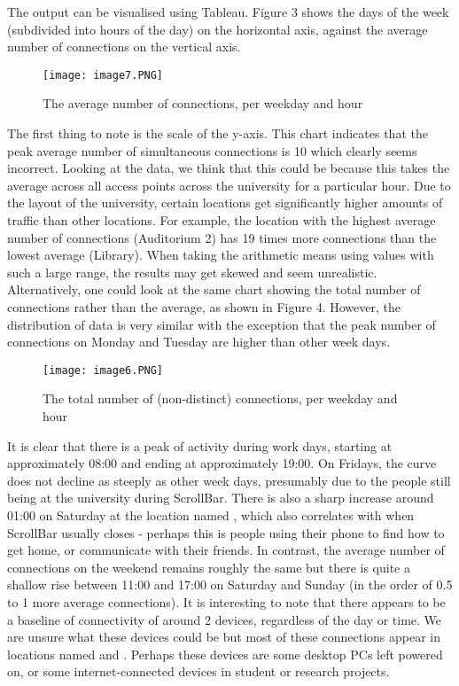 \documentclass[format=acmsmall, review=false, screen=true]{acmart}
\begin{document}
The output can be visualised using Tableau. Figure 3 shows the days of the week (subdivided into hours of the day) on the horizontal axis, against the average number of connections on the vertical axis.

\begin{figure}[H]
  \texttt{[image: image7.PNG]}
  \caption{The average number of connections, per weekday and hour}
  \label{fig:main-diagram}
\end{figure}

The first thing to note is the scale of the y-axis. This chart indicates that the peak average number of simultaneous connections is 10 which clearly seems incorrect. Looking at the data, we think that this could be because this takes the average across all access points across the university for a particular hour. Due to the layout of the university, certain locations get significantly higher amounts of traffic than other locations. For example, the location with the highest average number of connections (Auditorium 2) has 19 times more connections than the lowest average (Library). When taking the arithmetic means using values with such a large range, the results may get skewed and seem unrealistic. Alternatively, one could look at the same chart showing the total number of connections rather than the average, as shown in Figure 4. However, the distribution of data is very similar with the exception that the peak number of connections on Monday and Tuesday are higher than other week days.

\begin{figure}[H]
  \texttt{[image: image6.PNG]}
  \caption{The total number of (non-distinct) connections, per weekday and hour}
  \label{fig:main-diagram}
\end{figure}

It is clear that there is a peak of activity during work days, starting at approximately 08:00 and ending at approximately 19:00. On Fridays, the curve does not decline as steeply as other week days, presumably due to the people still being at the university during ScrollBar. There is also a sharp increase around 01:00 on Saturday at the location named , which also correlates with when ScrollBar usually closes - perhaps this is people using their phone to find how to get home, or communicate with their friends. In contrast, the average number of connections on the weekend remains roughly the same but there is quite a shallow rise between 11:00 and 17:00 on Saturday and Sunday (in the order of 0.5 to 1 more average connections). It is interesting to note that there appears to be a baseline of connectivity of around 2 devices, regardless of the day or time. We are unsure what these devices could be but most of these connections appear in locations named  and . Perhaps these devices are some desktop PCs left powered on, or some internet-connected devices in student or research projects.
\end{document}

